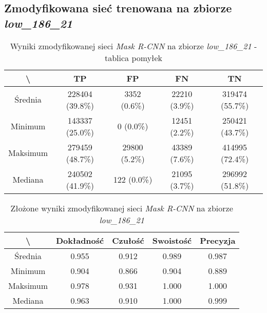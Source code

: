\subsection{Zmodyfikowana sieć trenowana na zbiorze \textit{low\_186\_21}}

\begin{table}[H]
	\centering
	\caption{Wyniki zmodyfikowanej sieci \textit{Mask R-CNN} na zbiorze \textit{low\_186\_21} - tablica pomyłek}
	\vspace{6pt}
	{\footnotesize
		\begin{tabular}{|c|c|c|c|c|}
      \hline \textbackslash & TP & FP & FN & TN \\
      \hline Średnia & 228404 (39.8\%) & 3352 (0.6\%) & 22210 (3.9\%) & 319474 (55.7\%) \\
      \hline Minimum & 143337 (25.0\%) & 0 (0.0\%) & 12451 (2.2\%) & 250421 (43.7\%) \\
      \hline Maksimum & 279459 (48.7\%) & 29800 (5.2\%) & 43389 (7.6\%) & 414995 (72.4\%) \\
      \hline Mediana & 240502 (41.9\%) & 122 (0.0\%) & 21095 (3.7\%) & 296992 (51.8\%) \\
      \hline
		\end{tabular}
	}
  \vspace{0pt}
  \label{Tab:low_modified}
\end{table}


\begin{table}[H]
	\centering
	\caption{Złożone wyniki zmodyfikowanej sieci \textit{Mask R-CNN} na zbiorze \textit{low\_186\_21}}
	\vspace{6pt}
	{\footnotesize
		\begin{tabular}{|c|c|c|c|c|}
      \hline \textbackslash & Dokładność & Czułość & Swoistość & Precyzja \\
      \hline Średnia & 0.955 & 0.912 & 0.989 & 0.987 \\
      \hline Minimum & 0.904 & 0.866 & 0.904 & 0.889 \\
      \hline Maksimum & 0.978 & 0.931 & 1.000 & 1.000 \\
      \hline Mediana & 0.963 & 0.910 & 1.000 & 0.999 \\
      \hline
		\end{tabular}
	}
  \vspace{0pt}
  \label{Tab:low_modified_calculated}
\end{table}

